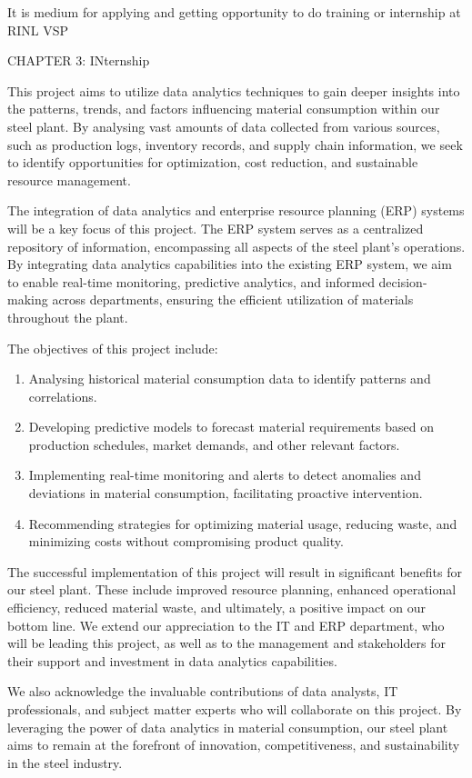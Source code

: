 \documentclass{article} %
\begin{document}
\noindent It is medium for applying and getting opportunity to do training or internship at RINL VSP

\noindent 

\noindent \eject 

\noindent 

\noindent CHAPTER 3: INternship 

\noindent 

\noindent This project aims to utilize data analytics techniques to gain deeper insights into the patterns, trends, and factors influencing material consumption within our steel plant. By analysing vast amounts of data collected from various sources, such as production logs, inventory records, and supply chain information, we seek to identify opportunities for optimization, cost reduction, and sustainable resource management. 

\noindent The integration of data analytics and enterprise resource planning (ERP) systems will be a key focus of this project. The ERP system serves as a centralized repository of information, encompassing all aspects of the steel plant's operations. By integrating data analytics capabilities into the existing ERP system, we aim to enable real-time monitoring, predictive analytics, and informed decision-making across departments, ensuring the efficient utilization of materials throughout the plant.

\noindent The objectives of this project include: 

\begin{enumerate}
\item  Analysing historical material consumption data to identify patterns and correlations. 

\item  Developing predictive models to forecast material requirements based on production schedules, market demands, and other relevant factors.

\item  Implementing real-time monitoring and alerts to detect anomalies and deviations in material consumption, facilitating proactive intervention. 

\item   Recommending strategies for optimizing material usage, reducing waste, and minimizing costs without compromising product quality. 
\end{enumerate}

\noindent The successful implementation of this project will result in significant benefits for our steel plant. These include improved resource planning, enhanced operational efficiency, reduced material waste, and ultimately, a positive impact on our bottom line. We extend our appreciation to the IT and ERP department, who will be leading this project, as well as to the management and stakeholders for their support and investment in data analytics capabilities. 

\noindent We also acknowledge the invaluable contributions of data analysts, IT professionals, and subject matter experts who will collaborate on this project. By leveraging the power of data analytics in material consumption, our steel plant aims to remain at the forefront of innovation, competitiveness, and sustainability in the steel industry.
\end{document}
